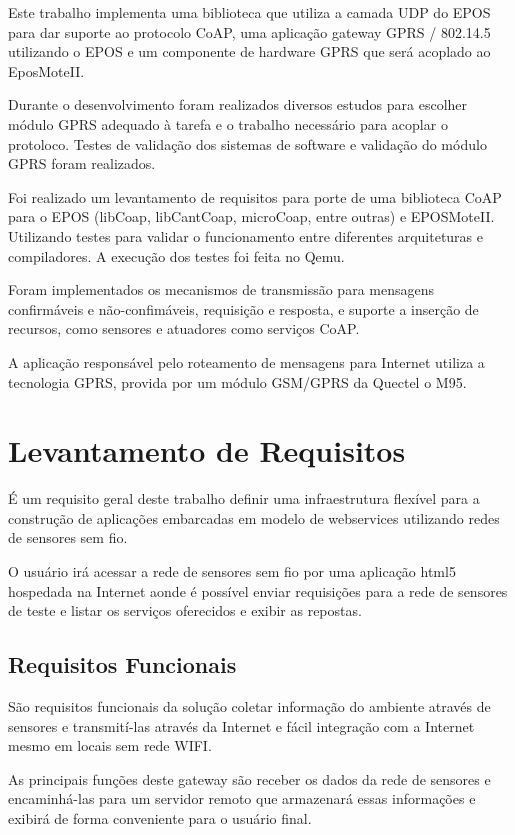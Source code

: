 Este trabalho implementa uma biblioteca que utiliza a camada UDP do EPOS para dar suporte ao protocolo CoAP, uma aplica\c{c}\~ao gateway GPRS / 802.14.5 utilizando o EPOS e um componente de hardware GPRS que ser\'a acoplado ao EposMoteII.

Durante o desenvolvimento foram realizados diversos estudos para escolher m\'odulo GPRS adequado \`a tarefa e o trabalho necess\'ario para acoplar o protoloco. Testes de valida\c{c}\~ao dos sistemas de software e valida\c{c}\~ao do m\'odulo GPRS foram realizados.

Foi realizado um levantamento de requisitos para porte de uma biblioteca CoAP para o EPOS (libCoap, libCantCoap, microCoap, entre outras) e EPOSMoteII. Utilizando testes para validar o funcionamento entre diferentes arquiteturas e compiladores. A execu\c{c}\~ao dos testes foi feita no Qemu.

Foram implementados os mecanismos de transmiss\~ao para mensagens confirm\'aveis e n\~ao-confim\'aveis, requisi\c{c}\~ao e resposta, e suporte a inser\c{c}\~ao de recursos, como sensores e atuadores como servi\c{c}os CoAP.

A aplica\c{c}\~ao respons\'avel pelo roteamento de mensagens para Internet utiliza a tecnologia GPRS, provida por um m\'odulo GSM/GPRS da Quectel o M95.

\section{Levantamento de Requisitos}
\'E um requisito geral deste trabalho definir uma infraestrutura flex\'ivel para a constru\c{c}\~ao de aplica\c{c}\~oes embarcadas em modelo de webservices utilizando redes de sensores sem fio.

O usu\'ario ir\'a acessar a rede de sensores sem fio por uma aplica\c{c}\~ao html5 hospedada na Internet aonde \'e poss\'ivel enviar requisi\c{c}\~oes para a rede de sensores de teste e listar os servi\c{c}os oferecidos e exibir as repostas.

\subsection{Requisitos Funcionais}
S\~ao requisitos funcionais da solu\c{c}\~ao coletar informa\c{c}\~ao do ambiente atrav\'es de sensores e transmit\'i-las atrav\'es da Internet e f\'acil integra\c{c}\~ao com a Internet mesmo em locais sem rede WIFI.

As principais fun\c{c}\~oes deste gateway s\~ao receber os dados da rede de sensores e encaminh\'a-las para um servidor remoto que armazenar\'a essas informa\c{c}\~oes e exibir\'a de forma conveniente para o usu\'ario final.

